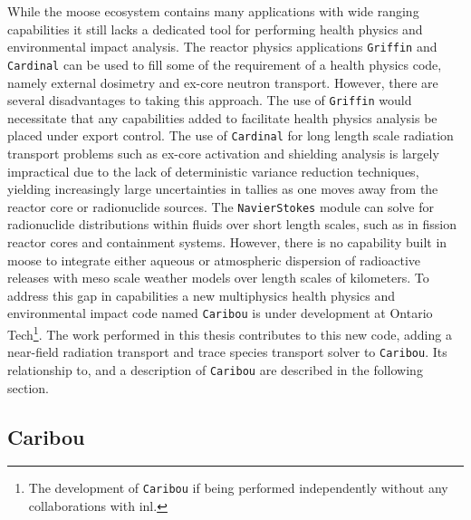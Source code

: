 While the \acrshort{moose} ecosystem contains many applications with wide ranging capabilities it still lacks a dedicated tool for performing health physics and environmental impact analysis. The reactor physics applications \texttt{Griffin} and \texttt{Cardinal} can be used to fill some of the requirement of a health physics code, namely external dosimetry and ex-core neutron transport. However, there are several disadvantages to taking this approach. The use of \texttt{Griffin} would necessitate that any capabilities added to facilitate health physics analysis be placed under export control. The use of \texttt{Cardinal} for long length scale radiation transport problems such as  ex-core activation and shielding analysis is largely impractical due to the lack of deterministic variance reduction techniques, yielding increasingly large uncertainties in tallies as one moves away from the reactor core or radionuclide sources. The \texttt{NavierStokes} module can solve for radionuclide distributions within fluids over short length scales, such as in fission reactor cores and containment systems. However, there is no capability built in \acrshort{moose} to integrate either aqueous or atmospheric dispersion of radioactive releases with meso scale weather models over length scales of kilometers. To address this gap in capabilities a new multiphysics health physics and environmental impact code named \texttt{Caribou} is under development at Ontario Tech\footnote{The development of \texttt{Caribou} if being performed independently without any collaborations with \acrshort{inl}.}. The work performed in this thesis contributes to this new code, adding a near-field radiation transport and trace species transport solver to \texttt{Caribou}. Its relationship to, and a description of \texttt{Caribou} are described in the following section.

\subsection{Caribou}
\label{introduction:ms:caribou}

